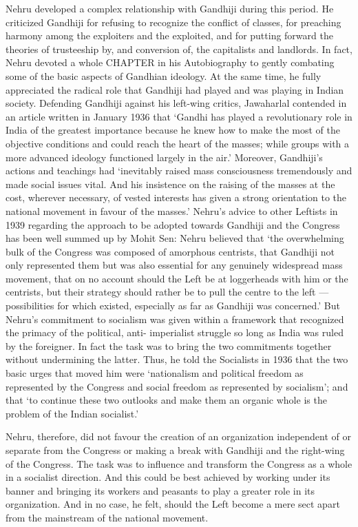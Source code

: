 Nehru developed a complex relationship with Gandhiji during this period. He criticized Gandhiji for refusing to recognize the conflict of classes, for preaching harmony among the exploiters and the exploited, and for putting forward the theories of trusteeship by, and conversion of, the capitalists and landlords. In fact, Nehru devoted a whole CHAPTER in his Autobiography to gently combating some of the basic aspects of Gandhian ideology. At the same time, he fully appreciated the radical role that Gandhiji had played and was playing in Indian society. Defending Gandhiji against his left-wing critics, Jawaharlal contended in an article written in January 1936 that `Gandhi has played a revolutionary role in India of the greatest importance because he knew how to make the most of the objective conditions and could reach the heart of the masses; while groups with a more advanced ideology functioned largely in the air.' Moreover, Gandhiji's actions and teachings had `inevitably raised mass consciousness tremendously and made social issues vital. And his insistence on the raising of the masses at the cost, wherever necessary, of vested interests has given a strong orientation to the national movement in favour of the masses.' Nehru's advice to other Leftists in 1939 regarding the approach to be adopted towards Gandhiji and the Congress has been well summed up by Mohit Sen: Nehru believed that `the overwhelming bulk of the Congress was composed of amorphous centrists, that Gandhiji not only represented them but was also essential for any genuinely widespread mass movement, that on no account should the Left be at loggerheads with him or the centrists, but their strategy should rather be to pull the centre to the left — possibilities for which existed, especially as far as Gandhiji was concerned.' But Nehru's commitment to socialism was given within a framework that recognized the primacy of the political, anti- imperialist struggle so long as India was ruled by the foreigner. In fact the task was to bring the two commitments together without undermining the latter. Thus, he told the Socialists in 1936 that the two basic urges that moved him were `nationalism and political freedom as represented by the Congress and social freedom as represented by socialism'; and that `to continue these two outlooks and make them an organic whole is the problem of the Indian socialist.' 

Nehru, therefore, did not favour the creation of an organization independent of or separate from the Congress or making a break with Gandhiji and the right-wing of the Congress. The task was to influence and transform the Congress as a whole in a socialist direction. And this could be best achieved by working under its banner and bringing its workers and peasants to play a greater role in its organization. And in no case, he felt, should the Left become a mere sect apart from the mainstream of the national movement.

